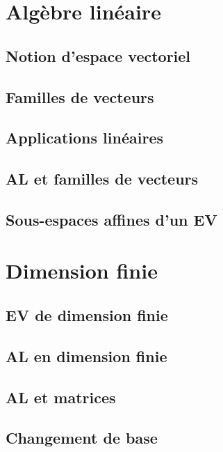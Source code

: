 \documentclass[11pt,twoside,a4paper]{article}
\begin{document}

\newpage
\section{Algèbre linéaire}

\subsection{Notion d'espace vectoriel}

\subsection{Familles de vecteurs}

\subsection{Applications linéaires}

\subsection{AL et familles de vecteurs}

\subsection{Sous-espaces affines d'un EV}

\newpage
\section{Dimension finie}

\subsection{EV de dimension finie}

\subsection{AL en dimension finie}

\subsection{AL et matrices}

\subsection{Changement de base}
\end{document}
